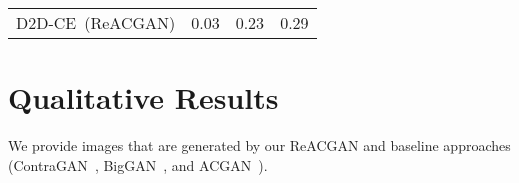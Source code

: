 \documentclass{article}
\begin{document}
\begin{table}[ht]
{\begin{tabular}{lccc}
\rowcolor{yellow!20}D2D-CE~(ReACGAN) & 0.03 & 0.23 & 0.29 \\
\cmidrule[1.0pt]{1-4}
\end{tabular}}
\end{table} \begin{table}[ht]
\centering
\caption{Ablation study on the number of negative samples.}
\vspace{2mm}
\label{table:negative_ablation}
\end{table}
  \section{Qualitative Results}
\label{qualitative_all}
We provide images that are generated by our ReACGAN and baseline approaches (ContraGAN~\cite{kang2020contragan}, BigGAN~\cite{Brock2019LargeSG}, and ACGAN~\cite{Odena2017ConditionalIS}).
\end{document}
